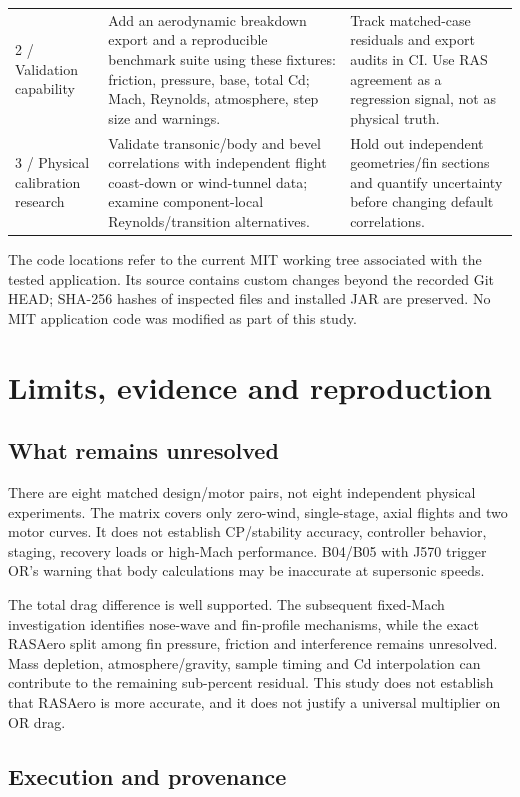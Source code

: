\documentclass[oneside,openany]{amsdtx}
\begin{document}
{\begin{longtable}{@{}L{0.180\textwidth}L{0.440\textwidth}L{0.320\textwidth}@{}}
2 / Validation capability & Add an aerodynamic breakdown export and a reproducible benchmark suite using these fixtures: friction, pressure, base, total Cd; Mach, Reynolds, atmosphere, step size and warnings. & Track matched-case residuals and export audits in CI. Use RAS agreement as a regression signal, not as physical truth.\\
3 / Physical calibration research & Validate transonic/body and bevel correlations with independent flight coast-down or wind-tunnel data; examine component-local Reynolds/transition alternatives. & Hold out independent geometries/fin sections and quantify uncertainty before changing default correlations.\\
\end{longtable}}

The code locations refer to the current MIT working tree associated with the tested application. Its source contains custom changes beyond the recorded Git HEAD; SHA-256 hashes of inspected files and installed JAR are preserved. No MIT application code was modified as part of this study.


\clearpage\section{Limits, evidence and reproduction}

\subsection{What remains unresolved}

There are eight matched design/motor pairs, not eight independent physical experiments. The matrix covers only zero-wind, single-stage, axial flights and two motor curves. It does not establish CP/stability accuracy, controller behavior, staging, recovery loads or high-Mach performance. B04/B05 with J570 trigger OR's warning that body calculations may be inaccurate at supersonic speeds.


The total drag difference is well supported. The subsequent fixed-Mach investigation identifies nose-wave and fin-profile mechanisms, while the exact RASAero split among fin pressure, friction and interference remains unresolved. Mass depletion, atmosphere/gravity, sample timing and Cd interpolation can contribute to the remaining sub-percent residual. This study does not establish that RASAero is more accurate, and it does not justify a universal multiplier on OR drag.


\subsection{Execution and provenance}
\end{document}
